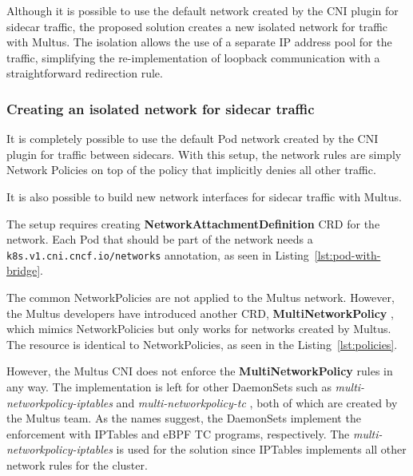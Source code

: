 \documentclass[english, 12pt, a4paper, sci, utf8, a-2b, online]{aaltothesis}
\begin{document}
Although it is possible to use the default network created by the CNI plugin for sidecar traffic, the proposed solution creates a new isolated network for traffic with Multus.
The isolation allows the use of a separate IP address pool for the traffic, simplifying the re-implementation of loopback communication with a straightforward redirection rule.

\subsubsection{Creating an isolated network for sidecar traffic}

It is completely possible to use the default Pod network created by the CNI plugin for traffic between sidecars.
With this setup, the network rules are simply Network Policies on top of the policy that implicitly denies all other traffic.

It is also possible to build new network interfaces for sidecar traffic with Multus.



The setup requires creating \textbf{NetworkAttachmentDefinition} CRD for the network.
Each Pod that should be part of the network needs a \lstinline{k8s.v1.cni.cncf.io/networks} annotation, as seen in Listing~\ref{lst:pod-with-bridge}.



The common NetworkPolicies are not applied to the Multus network.
However, the Multus developers have introduced another CRD, \textbf{MultiNetworkPolicy} \cite{multi-network-policy}, which mimics NetworkPolicies but only works for networks created by Multus.
The resource is identical to NetworkPolicies, as seen in the Listing~\ref{lst:policies}.



However, the Multus CNI does not enforce the \textbf{MultiNetworkPolicy} rules in any way.
The implementation is left for other DaemonSets such as \emph{multi-networkpolicy-iptables} \cite{multi-network-policy-iptables} and \emph{multi-networkpolicy-tc} \cite{multi-network-policy-tc}, both of which are created by the Multus team.
As the names suggest, the DaemonSets implement the enforcement with IPTables and eBPF TC programs, respectively.
The \emph{multi-networkpolicy-iptables} is used for the solution since IPTables implements all other network rules for the cluster.
\end{document}
